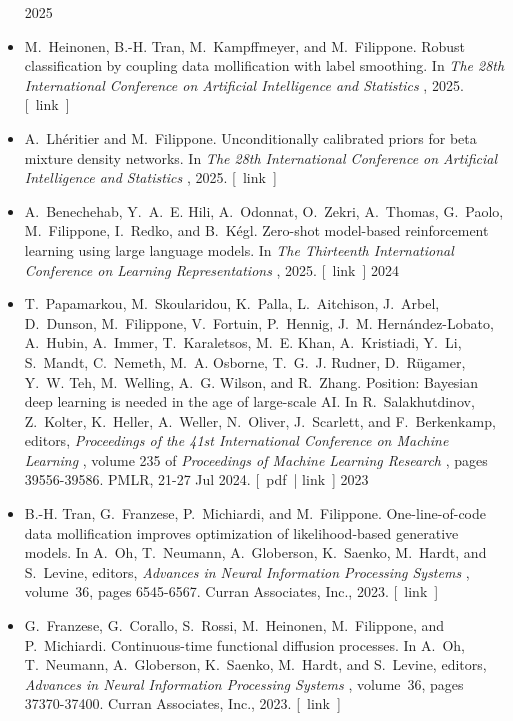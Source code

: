 \documentclass[10pt]{article}
\begin{document}
\begin{itemize}
2025\item 

  M. Heinonen, B.-H. Tran, M. Kampffmeyer, and M. Filippone. Robust classification by coupling data mollification with label smoothing. In \emph{The 28th International Conference on Artificial Intelligence and Statistics}
, 2025. [ link ] 

\item 

  A. Lh\'eritier and M. Filippone. Unconditionally calibrated priors for beta mixture density networks. In \emph{The 28th International Conference on Artificial Intelligence and Statistics}
, 2025. [ link ] 

\item 

  A. Benechehab, Y. A. E. Hili, A. Odonnat, O. Zekri, A. Thomas, G. Paolo, M. Filippone, I. Redko, and B. K\'egl. Zero-shot model-based reinforcement learning using large language models. In \emph{The Thirteenth International Conference on Learning Representations}
, 2025. [ link ] 
2024
\item 

  T. Papamarkou, M. Skoularidou, K. Palla, L. Aitchison, J. Arbel, D. Dunson, M. Filippone, V. Fortuin, P. Hennig, J. M. Hern\'andez-Lobato, A. Hubin, A. Immer, T. Karaletsos, M. E. Khan, A. Kristiadi, Y. Li, S. Mandt, C. Nemeth, M. A. Osborne, T. G. J. Rudner, D. R\"ugamer, Y. W. Teh, M. Welling, A. G. Wilson, and R. Zhang. Position: Bayesian deep learning is needed in the age of large-scale AI. In R. Salakhutdinov, Z. Kolter, K. Heller, A. Weller, N. Oliver, J. Scarlett, and F. Berkenkamp, editors, \emph{Proceedings of the 41st International Conference on Machine Learning}
, volume 235 of \emph{Proceedings of Machine Learning Research}
, pages 39556-39586. PMLR, 21-27 Jul 2024. [ pdf | link ] 
2023
\item 

  B.-H. Tran, G. Franzese, P. Michiardi, and M. Filippone. One-line-of-code data mollification improves optimization of likelihood-based generative models. In A. Oh, T. Neumann, A. Globerson, K. Saenko, M. Hardt, and S. Levine, editors, \emph{Advances in Neural Information Processing Systems}
, volume 36, pages 6545-6567. Curran Associates, Inc., 2023. [ link ] 

\item 

  G. Franzese, G. Corallo, S. Rossi, M. Heinonen, M. Filippone, and P. Michiardi. Continuous-time functional diffusion processes. In A. Oh, T. Neumann, A. Globerson, K. Saenko, M. Hardt, and S. Levine, editors, \emph{Advances in Neural Information Processing Systems}
, volume 36, pages 37370-37400. Curran Associates, Inc., 2023. [ link ] 


\end{itemize}
\end{document}
